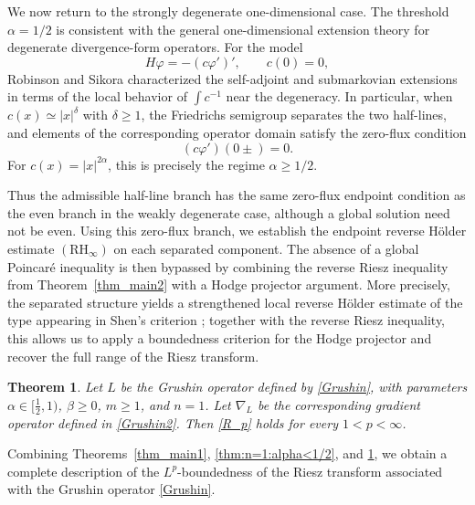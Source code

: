 \documentclass[12pt]{amsart}
\newtheorem{theorem}{Theorem}[section]
\begin{document}
We now return to the strongly degenerate one-dimensional case. The threshold
$\alpha=1/2$ is consistent with the general one-dimensional extension theory
for degenerate divergence-form operators. For the model
\begin{equation*}
    H\varphi=-(c\varphi')',
    \qquad c(0)=0,
\end{equation*}
Robinson and Sikora \cite{RS_1D} characterized the self-adjoint and
submarkovian extensions in terms of the local behavior of $\int c^{-1}$ near
the degeneracy. In particular, when
$c(x)\simeq|x|^\delta$ with $\delta\geq1$, the Friedrichs semigroup separates
the two half-lines, and elements of the corresponding operator domain satisfy
the zero-flux condition
\begin{equation*}
    (c\varphi')(0\pm)=0.
\end{equation*}
For $c(x)=|x|^{2\alpha}$, this is precisely the regime
$\alpha\geq1/2$.

Thus the admissible half-line branch has the same zero-flux endpoint condition
as the even branch in the weakly degenerate case, although a global solution
need not be even. Using this zero-flux branch, we establish the endpoint
reverse H\"older estimate $(\mathrm{RH}_\infty)$ on each separated component.
The absence of a global Poincar\'e inequality is then bypassed by combining
the reverse Riesz inequality from Theorem~\ref{thm_main2} with a Hodge
projector argument. More precisely, the separated structure yields a
strengthened local reverse H\"older estimate of the type appearing in
Shen's criterion \cite{Shen}; together with the reverse Riesz inequality,
this allows us to apply a boundedness criterion for the Hodge projector and
recover the full range of the Riesz transform.

\begin{theorem}\label{thm:n=1:alpha>1/2}
Let $L$ be the Grushin operator defined by \eqref{Grushin}, with parameters
$\alpha\in[\frac12,1)$, $\beta\geq0$, $m\geq1$, and $n=1$. Let $\nabla_L$ be
the corresponding gradient operator defined in \eqref{Grushin2}. Then
\eqref{R_p} holds for every $1<p<\infty$.
\end{theorem}

Combining Theorems~\ref{thm_main1}, \ref{thm:n=1:alpha<1/2}, and
\ref{thm:n=1:alpha>1/2}, we obtain a complete description of the
$L^p$-boundedness of the Riesz transform associated with the Grushin operator
\eqref{Grushin}.

\medskip
\end{document}
